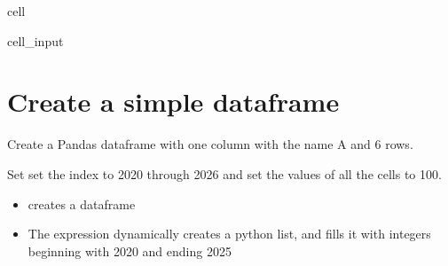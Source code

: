 \documentclass[letterpaper,10pt,english]{jupyterBook}
\begin{document}
\begin{sphinxuseclass}{cell}\begin{sphinxVerbatimInput}

\begin{sphinxuseclass}{cell_input}
\begin{sphinxVerbatim}[commandchars=\\\{\}]
     
        
\end{sphinxVerbatim}

\end{sphinxuseclass}\end{sphinxVerbatimInput}

\end{sphinxuseclass}

\section{Create a  simple dataframe}
\label{\detokenize{content/04_PythonEssentials/ExtendingDataFrames:create-a-simple-dataframe}}
\sphinxAtStartPar
Create a Pandas dataframe with one column with the name A and 6 rows.

\sphinxAtStartPar
Set set the index to 2020 through 2026 and set the values of all the cells to 100.
\begin{itemize}
\item {} 
\sphinxAtStartPar
{} creates a dataframe  

\item {} 
\sphinxAtStartPar
The expression  dynamically creates a  python list, and fills it with  integers beginning with 2020 and ending 2025

\end{itemize}
\end{document}
